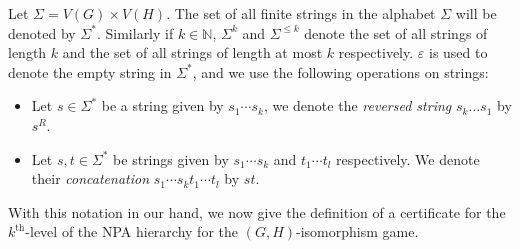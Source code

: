 \documentclass[a4paper,onecolumn,11pt,accepted=2026-01-06]{quantumarticle}
\theoremstyle{plain}
\theoremstyle{remark}
\theoremstyle{definition}
\renewcommand{\epsilon}{\varepsilon}
\begin{document}
Let $\Sigma = V(G) \times V(H)$. The set of all finite strings in the alphabet $\Sigma$ will be denoted by $\Sigma^*$. Similarly if $k \in \mathbb{N}$, $\Sigma^k$ and $\Sigma^{\leq k}$ denote the set of all strings of length $k$ and the set of all strings of length at most $k$ respectively. $\epsilon$ is used to denote the empty string in $\Sigma^*$, and we use the following operations on strings: 
\begin{itemize}
    \item Let $s \in \Sigma^*$ be a string given by $s_1\cdots s_k$, we denote the \emph{reversed string} $s_k\dots s_1$ by $s^R$. 
    \item Let $s,t \in \Sigma^*$ be strings given by $s_1\cdots s_k$ and $t_1\cdots t_l$ respectively. We denote their \emph{concatenation} $s_1\cdots s_k t_1 \cdots t_l$ by $st$.  
\end{itemize}

With this notation in our hand, we now give the definition of a certificate for the $k^{\text{th}}$-level of the NPA hierarchy for the $(G, H)$-isomorphism game.

\end{document}
